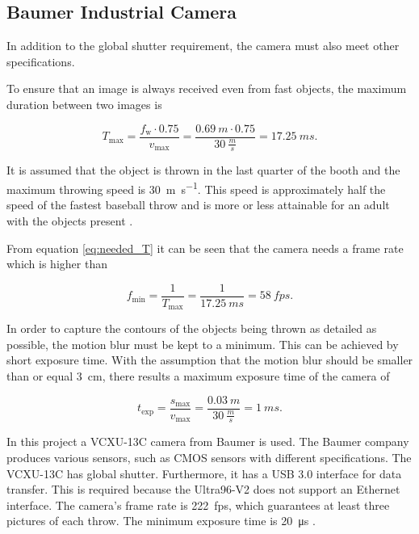 \subsection{Baumer Industrial Camera}
\label{subsec:baumer_cam}

In addition to the global shutter requirement, the camera must also meet other specifications.

To ensure that an image is always received even from fast objects, the maximum duration between two images is

\begin{equation}
  T_\text{max} = \frac{f_\text{w} \cdot 0.75}{v_\text{max}} = \frac{\SI{0.69}{m} \cdot 0.75}{\SI{30}{\frac{m}{s}}} = \SI{17.25}{ms}.
  \label{eq:needed_T}
\end{equation}

It is assumed that the object is thrown in the last quarter of the booth and the maximum throwing speed is \SI[fraction=sfrac]{30}{\metre\per\second}.
This speed is approximately half the speed of the fastest baseball throw and is more or less attainable for an adult with the objects present \cite{speed_baseball}.

From equation \ref{eq:needed_T} it can be seen that the camera needs a frame rate which is higher than

\begin{equation}
  f_\text{min} = \frac{1}{T_\text{max}} = \frac{1}{\SI{17.25}{ms}} = \SI{58}{fps}.
  \label{eq:needed_fps}
\end{equation}

In order to capture the contours of the objects being thrown as detailed as possible, the motion blur must be kept to a minimum. 
This can be achieved by short exposure time. 
With the assumption that the motion blur should be smaller than or equal \SI{3}{cm}, there results a maximum exposure time of the camera of

\begin{equation}
  t_\text{exp} = \frac{s_\text{max}}{v_\text{max}} = \frac{\SI{0.03}{m}}{\SI{30}{\frac{m}{s}}} = \SI{1}{ms}.
  \label{eq:texp}
\end{equation}

In this project a VCXU-13C camera from Baumer is used.
The Baumer company produces various sensors, such as CMOS sensors with different specifications.
The VCXU-13C has global shutter.
Furthermore, it has a USB 3.0 interface for data transfer.
This is required because the Ultra96-V2 does not support an Ethernet interface.
The camera's frame rate is \SI{222}{fps}, which guarantees at least three pictures of each throw.
The minimum exposure time is \SI{20}{\micro s} \cite{baumer_cam}.

